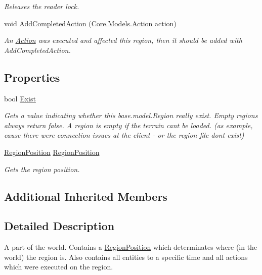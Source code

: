 \begin{DoxyCompactItemize}
\begin{DoxyCompactList}\small\item\em Releases the reader lock. \end{DoxyCompactList}\item 
void \hyperlink{classCore_1_1Models_1_1Region_a73612bd601b7c22498bb599e82e83cfb}{Add\+Completed\+Action} (\hyperlink{classCore_1_1Models_1_1Action}{Core.\+Models.\+Action} action)
\begin{DoxyCompactList}\small\item\em An \hyperlink{classCore_1_1Models_1_1Action}{Action} was executed and affected this region, then it should be added with Add\+Completed\+Action. \end{DoxyCompactList}\end{DoxyCompactItemize}
\subsection*{Properties}
\begin{DoxyCompactItemize}
\item 
bool \hyperlink{classCore_1_1Models_1_1Region_a8521c3cdb0ee6884d5e394217b44c66e}{Exist}
\begin{DoxyCompactList}\small\item\em Gets a value indicating whether this base.\+model.\+Region really exist. Empty regions always return false. A region is empty if the terrain can\textquotesingle{}t be loaded. (as example, cause there were connection issues at the client -\/ or the region file don\textquotesingle{}t exist) \end{DoxyCompactList}\item 
\hyperlink{classCore_1_1Models_1_1RegionPosition}{Region\+Position} \hyperlink{classCore_1_1Models_1_1Region_a2b370559aea0f72e9c2ee19dfcc7f7d8}{Region\+Position}
\begin{DoxyCompactList}\small\item\em Gets the region position. \end{DoxyCompactList}\end{DoxyCompactItemize}
\subsection*{Additional Inherited Members}


\subsection{Detailed Description}
A part of the world. Contains a \hyperlink{classCore_1_1Models_1_1RegionPosition}{Region\+Position} which determinates where (in the world) the region is. Also contains all entities to a specific time and all actions which were executed on the region. 



